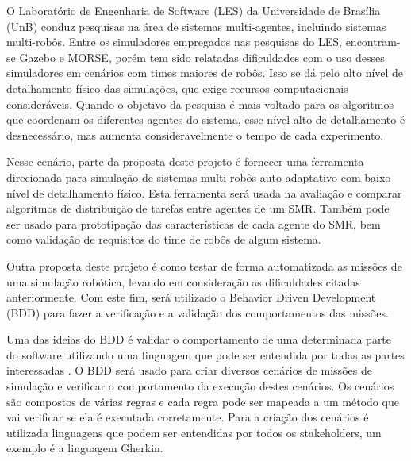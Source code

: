 O Laboratório de Engenharia de Software (LES) da Universidade de Brasília (UnB) conduz pesquisas na área de sistemas multi-agentes, incluindo sistemas multi-robôs. Entre os simuladores empregados nas pesquisas do LES, encontram-se Gazebo e MORSE, porém tem sido relatadas dificuldades com o uso desses simuladores em cenários com times maiores de robôs. Isso se dá pelo alto nível de detalhamento físico das simulações, que exige recursos computacionais consideráveis. Quando o objetivo da pesquisa é mais voltado para os algoritmos que coordenam os diferentes agentes do sistema, esse nível alto de detalhamento é desnecessário, mas aumenta consideravelmente o tempo de cada experimento.

Nesse cenário, parte da proposta deste projeto é fornecer uma ferramenta direcionada para simulação de sistemas multi-robôs auto-adaptativo com baixo nível de detalhamento físico. Esta ferramenta será usada na avaliação e comparar algoritmos de distribuição de tarefas entre agentes de um SMR. Também pode ser usado para prototipação das características de cada agente do SMR, bem como validação de requisitos do time de robôs de algum sistema.

Outra proposta deste projeto é como testar de forma automatizada as missões de uma simulação robótica, levando em consideração as dificuldades citadas anteriormente. Com este fim, será utilizado o Behavior Driven Development (BDD) para fazer a verificação e a validação dos comportamentos das missões.


Uma das ideias do BDD é validar o comportamento de uma determinada parte do software utilizando uma linguagem que pode ser entendida por todas as partes interessadas \cite{bddInAction}. O BDD será usado para criar diversos cenários de missões de simulação e verificar o comportamento da execução destes cenários.  Os cenários são compostos de várias regras e cada regra pode ser mapeada a um método que vai verificar se ela é executada corretamente. Para a criação dos cenários é utilizada linguagens que podem ser entendidas por todos os stakeholders, um exemplo é a linguagem Gherkin.



